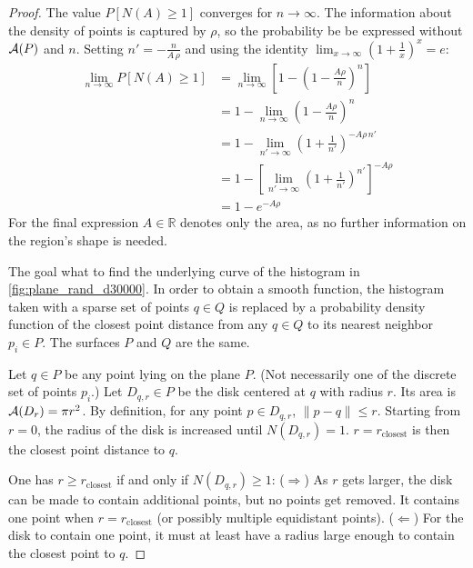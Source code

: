\begin{proof}
The value $P[N(A) \geq 1]$ converges for $n \rightarrow \infty$. The information about the density of points is captured by $\rho$, so the probability be be expressed without $\mathcal{A}(P)$ and $n$. Setting $n' = -\frac{n}{A \, \rho}$ and using the identity $\lim_{x \rightarrow \infty} \left( 1 + \frac{1}{x} \right)^x = e$:
\begin{equation}
\begin{align}
\lim_{n \rightarrow \infty} P[N(A) \geq 1]
& = \lim_{n \rightarrow \infty} \left[ 1 - \left(1 - \frac{A \rho}{n}\right)^n \right]\\
& = 1 - \lim_{n \rightarrow \infty} \left(1 - \frac{A \rho}{n}\right)^n \\
& = 1 - \lim_{n' \rightarrow \infty} \left(1 + \frac{1}{n'}\right)^{-A \rho \, n'}\\
& = 1 - \left[ \lim_{n' \rightarrow \infty} \left(1 + \frac{1}{n'}\right)^{n'} \right]^{-A \rho}\\
& = 1 - e^{-A \rho}
\end{align}
\label{eq:leastone_point_prob}
\end{equation}
For the final expression $A \in \mathbb{R}$ denotes only the area, as no further information on the region's shape is needed. 

The goal what to find the underlying curve of the histogram in \ref{fig:plane_rand_d30000}. In order to obtain a smooth function, the histogram taken with a sparse set of points $q \in Q$ is replaced by a probability density function of the closest point distance from any $q \in Q$ to its nearest neighbor $p_i \in P$. The surfaces $P$ and $Q$ are the same.

Let $q \in P$ be any point lying on the plane $P$. (Not necessarily one of the discrete set of points $p_i$.) Let $D_{q,r} \in P$ be the disk centered at $q$ with radius $r$. Its area is $\mathcal{A}(D_{r}) = \pi r^2$. By definition, for any point $p \in D_{q,r}$, $\| p - q \| \leq r$. Starting from $r = 0$, the radius of the disk is increased until $N(D_{q,r}) = 1$. $r = r_{\text{closest}}$ is then the closest point distance to $q$.

One has $r \geq r_{\text{closest}}$ if and only if $N(D_{q,r}) \geq 1$: ($\Rightarrow$) As $r$ gets larger, the disk can be made to contain additional points, but no points get removed. It contains one point when $r = r_{\text{closest}}$ (or possibly multiple equidistant points). ($\Leftarrow$) For the disk to contain one point, it must at least have a radius large enough to contain the closest point to $q$.


\end{proof}
